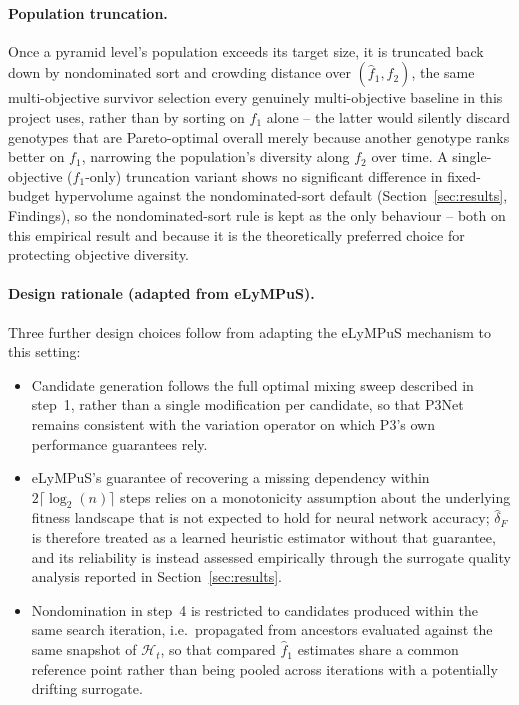 \paragraph{Population truncation.} Once a pyramid level's population exceeds its target size, it is truncated back down by nondominated sort and crowding distance over $(\hat{f}_1, f_2)$, the same multi-objective survivor selection every genuinely multi-objective baseline in this project uses, rather than by sorting on $f_1$ alone -- the latter would silently discard genotypes that are Pareto-optimal overall merely because another genotype ranks better on $f_1$, narrowing the population's diversity along $f_2$ over time. A single-objective ($f_1$-only) truncation variant shows no significant difference in fixed-budget hypervolume against the nondominated-sort default (Section~\ref{sec:results}, Findings), so the nondominated-sort rule is kept as the only behaviour -- both on this empirical result and because it is the theoretically preferred choice for protecting objective diversity.

\paragraph{Design rationale (adapted from eLyMPuS).} Three further design choices follow from adapting the eLyMPuS mechanism to this setting:
\begin{itemize}
    \item Candidate generation follows the full optimal mixing sweep described in step~1, rather than a single modification per candidate, so that P3Net remains consistent with the variation operator on which P3's own performance guarantees rely.
    \item eLyMPuS's guarantee of recovering a missing dependency within $2\lceil\log_2(n)\rceil$ steps relies on a monotonicity assumption about the underlying fitness landscape that is not expected to hold for neural network accuracy; $\hat{\delta}_F$ is therefore treated as a learned heuristic estimator without that guarantee, and its reliability is instead assessed empirically through the surrogate quality analysis reported in Section~\ref{sec:results}.
    \item Nondomination in step~4 is restricted to candidates produced within the same search iteration, i.e.\ propagated from ancestors evaluated against the same snapshot of $\mathcal{H}_t$, so that compared $\hat{f}_1$ estimates share a common reference point rather than being pooled across iterations with a potentially drifting surrogate.
\end{itemize}
